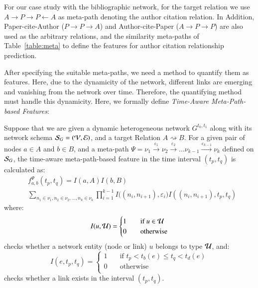 For our case study with the bibliographic network, for the target relation we use $A\rightarrow P\rightarrow P\leftarrow A$ as meta-path denoting the author citation relation. In Addition, Paper-cite-Author ($P\rightarrow P\rightarrow A$) and Author-cite-Paper ($A\rightarrow P\rightarrow P$) are also used as the arbitrary relations, and the similarity meta-paths of Table~\ref{table:meta} to define the features for author citation relationship prediction.

After specifying the suitable meta-paths, we need a method to quantify them as features. Here, due to the dynamicity of the network, different links are emerging and vanishing from the network over time. Therefore, the quantifying method must handle this dynamicity. Here, we formally define \emph{Time-Aware Meta-Path-based Features}:

\begin{definition}
Suppose that we are given a dynamic heterogeneous network $G^{t_0,t_1}$ along with its network schema $\mathcal{S}_G=(\mathcal{V}, \mathcal{E})$, and a target Relation $A\rightsquigarrow B$. For a given pair of nodes $a\in A$ and $b\in B$, and a meta-path $\Psi=\nu_1\xrightarrow{\varepsilon_1}\nu_2\xrightarrow{\varepsilon_2}\dots\nu_{k-1}\xrightarrow{\varepsilon_{k-1}}\nu_k$ defined on $\mathcal{S}_G$, the time-aware meta-path-based feature in the time interval $(t_p, t_q)$ is calculated as:
\begin{equation}
\begin{split}
&f_{a,b}^\Psi(t_p,t_q)=I(a,A)I(b,B)\\
&\sum_{n_1\in\nu_1,n_2\in\nu_2,\dots,n_k\in\nu_k}\prod_{i=1}^{k-1}I\Big((n_i,n_{i+1}),\varepsilon_i\Big)I\left((n_i,n_{i+1}),t_p,t_q\right)
\end{split}
\end{equation}
where:
\[
I(u,\mathcal{U})=
\begin{cases}
1&\quad\text{if } u\in \mathcal{U}\\
0&\quad\text{otherwise}\\
\end{cases}
\]
checks whether a network entity (node or link) $u$ belongs to type $\mathcal{U}$, and:
\[
I(e,t_p,t_q)=
\begin{cases}
1&\quad\text{if } t_p< t_b(e)\le t_q<t_d(e)\\
0&\quad\text{otherwise}\\
\end{cases}
\]
checks whether a link exists in the interval $(t_p,t_q)$.
\end{definition}

